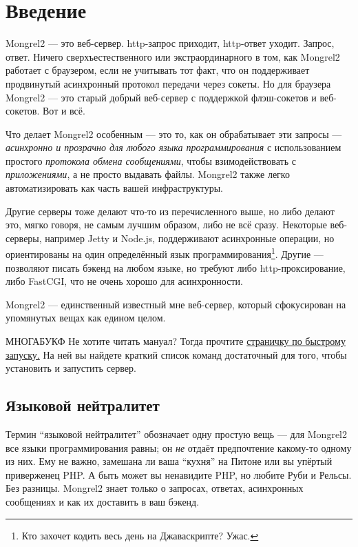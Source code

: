 \chapter{Введение}

Mongrel2 --- это веб-сервер. http-запрос приходит, http-ответ уходит.
Запрос, ответ. Ничего сверхъестественного или экстраординарного в том, как
Mongrel2 работает с браузером, если не учитывать тот факт, что он поддерживает
продвинутый асинхронный протокол передачи через сокеты. Но для браузера
Mongrel2 --- это старый добрый веб-сервер с поддержкой флэш-сокетов и веб-сокетов.
Вот и всё.

Что делает Mongrel2 особенным --- это то, как он обрабатывает эти запросы ---
\emph{асинхронно и прозрачно для любого языка программирования} с использованием
простого \emph{протокола обмена сообщениями}, чтобы взимодействовать с \emph{приложениями}, а
не просто выдавать файлы. Mongrel2 также легко автоматизировать как часть вашей
инфраструктуры.

Другие серверы тоже делают что-то из перечисленного выше, но либо делают это, мягко говоря,
не самым лучшим образом, либо не всё сразу. Некоторые веб-серверы, например Jetty
и Node.js, поддерживают асинхронные операции, но ориентированы на один определённый язык
программирования\footnote{Кто захочет кодить весь день на Джаваскрипте? Ужас.}. Другие ---
позволяют писать бэкенд на любом языке, но требуют либо http-проксирование, либо FastCGI,
что не очень хорошо для асинхронности.

Mongrel2 --- единственный известный мне веб-сервер, который сфокусирован на упомянутых
вещах как едином целом.

\begin{aside}{МНОГАБУКФ}
Не хотите читать мануал? Тогда прочтите \href{http://mongrel2.org/doc/tip/docs/ru/wiki/GettingStarted.wiki}
{страничку по быстрому запуску.} На ней вы найдете
краткий список команд достаточный для того, чтобы установить и запустить сервер.
\end{aside}

\section{Языковой нейтралитет}

Термин ``языковой нейтралитет'' обозначает одну простую вещь --- для Mongrel2
все языки программирования равны; он \emph{не} отдаёт предпочтение какому-то одному из них.
Ему не важно, замешана ли ваша ``кухня'' на Питоне или вы упёртый приверженец PHP.
А быть может вы ненавидите PHP, но любите Руби и Рельсы. Без разницы. Mongrel2
знает только о запросах, ответах, асинхронных сообщениях и как их доставить в ваш бэкенд.

